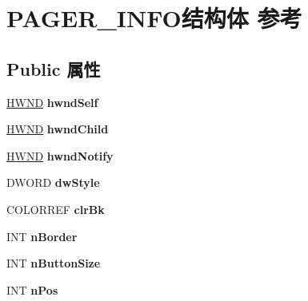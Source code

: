 \hypertarget{struct_p_a_g_e_r___i_n_f_o}{}\section{P\+A\+G\+E\+R\+\_\+\+I\+N\+F\+O结构体 参考}
\label{struct_p_a_g_e_r___i_n_f_o}
\subsection*{Public 属性}
\begin{DoxyCompactItemize}
\item 
\mbox{\label{struct_p_a_g_e_r___i_n_f_o_a91ef403093a50b9304968e508c08ed70}} 
\hyperlink{interfacevoid}{H\+W\+ND} {\bfseries hwnd\+Self}
\item 
\mbox{\label{struct_p_a_g_e_r___i_n_f_o_aa549a6aa7aa927a6adcdf08a3d124e87}} 
\hyperlink{interfacevoid}{H\+W\+ND} {\bfseries hwnd\+Child}
\item 
\mbox{\label{struct_p_a_g_e_r___i_n_f_o_adabbcdafaa7b95bcc1f517d64729dfd7}} 
\hyperlink{interfacevoid}{H\+W\+ND} {\bfseries hwnd\+Notify}
\item 
\mbox{\label{struct_p_a_g_e_r___i_n_f_o_a9e83ed0d4e532b1cd3393c548cbcd67f}} 
D\+W\+O\+RD {\bfseries dw\+Style}
\item 
\mbox{\label{struct_p_a_g_e_r___i_n_f_o_a3eb4bc615348c12d1347b4f3aa52d1fb}} 
C\+O\+L\+O\+R\+R\+EF {\bfseries clr\+Bk}
\item 
\mbox{\label{struct_p_a_g_e_r___i_n_f_o_af9245f64c301a475cee13ad56458b0ea}} 
I\+NT {\bfseries n\+Border}
\item 
\mbox{\label{struct_p_a_g_e_r___i_n_f_o_a6d8f222f77d5c3c42ebb66833464dfa6}} 
I\+NT {\bfseries n\+Button\+Size}
\item 
\mbox{\label{struct_p_a_g_e_r___i_n_f_o_a931ced0fe5c76b5f404379080733e415}} 
I\+NT {\bfseries n\+Pos}
\item 
\mbox{\label{struct_p_a_g_e_r___i_n_f_o_afd1ee1d512a16f0efd1d9d95bf02e52f}} 

\end{DoxyCompactItemize}
